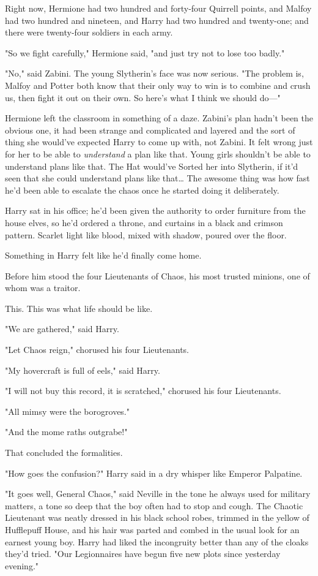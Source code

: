 Right now, Hermione had two hundred and forty-four Quirrell points, and Malfoy
had two hundred and nineteen, and Harry had two hundred and twenty-one; and
there were twenty-four soldiers in each army.

"So we fight carefully," Hermione said, "and just try not to lose too badly."

"No," said Zabini. The young Slytherin's face was now serious. "The problem is,
Malfoy and Potter both know that their only way to win is to combine and crush
us, then fight it out on their own. So here's what I think we should do---"

Hermione left the classroom in something of a daze. Zabini's plan hadn't been
the obvious one, it had been strange and complicated and layered and the sort
of thing she would've expected Harry to come up with, not Zabini. It felt wrong
just for her to be able to \emph{understand} a plan like that. Young girls
shouldn't be able to understand plans like that. The Hat would've Sorted her
into Slytherin, if it'd seen that she could understand plans like that…
\later
The awesome thing was how fast he'd been able to escalate the chaos once he
started doing it deliberately.

Harry sat in his office; he'd been given the authority to order furniture from
the house elves, so he'd ordered a throne, and curtains in a black and crimson
pattern. Scarlet light like blood, mixed with shadow, poured over the floor.

Something in Harry felt like he'd finally come home.

Before him stood the four Lieutenants of Chaos, his most trusted minions, one
of whom was a traitor.

This. This was what life should be like.

"We are gathered," said Harry.

"Let Chaos reign," chorused his four Lieutenants.

"My hovercraft is full of eels," said Harry.

"I will not buy this record, it is scratched," chorused his four Lieutenants.

"All mimsy were the borogroves."

"And the mome raths outgrabe!"

That concluded the formalities.

"How goes the confusion?" Harry said in a dry whisper like Emperor Palpatine.

"It goes well, General Chaos," said Neville in the tone he always used for
military matters, a tone so deep that the boy often had to stop and cough. The
Chaotic Lieutenant was neatly dressed in his black school robes, trimmed in the
yellow of Hufflepuff House, and his hair was parted and combed in the usual
look for an earnest young boy. Harry had liked the incongruity better than any
of the cloaks they'd tried. "Our Legionnaires have begun five new plots since
yesterday evening."

